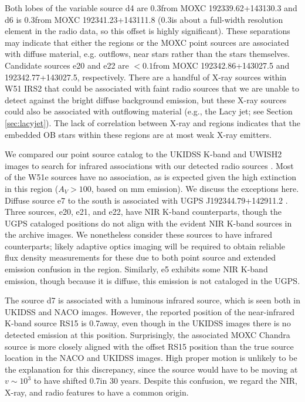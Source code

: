 Both lobes of the variable source d4 are
0.3\arcsec from MOXC 192339.62+143130.3 and d6 is 0.3\arcsec from MOXC
192341.23+143111.8 (0.3\arcsec is about a full-width resolution element in the
radio data, so this offset
is highly significant).    These
separations may indicate that either the \hii regions or the MOXC point sources
are associated with diffuse material, e.g. outflows,
near stars rather than the stars themselves.  
Candidate sources e20 and e22 are $<0.1$\arcsec from
MOXC 192342.86+143027.5 and 192342.77+143027.5, respectively.
There are a handful of X-ray
sources within W51 IRS2 that could be associated with faint radio sources that
we are unable to detect against the bright diffuse background emission, but
these X-ray sources could also be associated with
outflowing material (e.g., the Lacy jet; see Section \ref{sec:lacyjet}).  The
lack of correlation between X-ray and \hchii regions indicates that the
embedded OB stars within these \hchii regions are at most weak X-ray emitters.  

We compared our point source catalog to the UKIDSS K-band and UWISH2 \hh images
to search for infrared associations with our detected radio sources
\citep{Lucas2008a,Froebrich2011a}.  Most of the W51e sources have no
association, as is expected given the high extinction in this region
($A_V>100$, based on mm emission).  We discuss the exceptions here.  Diffuse
source e7 to the south is associated with UGPS
J192344.79+142911.2 \citep{Lucas2008a}.  Three sources, e20, e21, and
e22, have NIR K-band counterparts, though the UGPS cataloged positions do not
align with the evident NIR K-band sources in the archive images. We nonetheless
consider these sources
to have infrared counterparts; likely adaptive optics imaging will be required
to obtain reliable flux density measurements for these due to both point source
and extended emission confusion in the region.   Similarly, e5 exhibits some
NIR K-band emission, though because it is diffuse, this emission is
not cataloged in the UGPS.

The source d7 is associated with a luminous infrared source, which is
seen both in UKIDSS \citep{Lucas2008a} and NACO \citep{Figueredo2008a} images.
However, the reported position of the near-infrared K-band
\citet{Goldader1994a} source RS15 is
0.7\arcsec away, even though in the UKIDSS images there is no detected emission
at this position.  Surprisingly, the associated MOXC Chandra source
\citep{Townsley2014a} is more closely aligned with the offset RS15 position
than the true source location in the NACO and UKIDSS images.  High proper motion
is unlikely to be the explanation for this discrepancy, since the source
would have to be moving at $v\sim10^3$ \kms to have shifted 0.7\arcsec in 30
years.  Despite this confusion, we regard the NIR, X-ray, and radio features to
have a common
origin.


